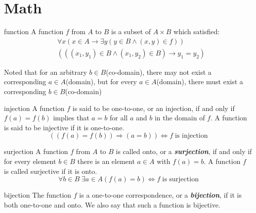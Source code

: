 \section{Math}

\begin{Def}{function}
	A function $f$ from $A$ to $B$ is a subset of $A \times B$ which satisfied:
	\begin{equation}
	\begin{aligned}
			&\forall x (x \in A \rightarrow \exists y (y \in B \land (x,y) \in f)) \\
			&(((x_1, y_1) \in B \land (x_1, y_2) \in B) \rightarrow y_1 = y_2)
	\end{aligned}
	\end{equation}	
\end{Def}

Noted that for an arbitrary $b \in B$(co-domain), there may not exist a corresponding $a \in A$(domain), but for every $a \in A$(domain), there must exist a corresponding $b \in B$(co-domain)

\begin{Def}{injection}
A function $f$ is said to be one-to-one, or an injection, if and only if $f (a) = f (b)$ implies that $a = b$ for all $a$ and $b$ in the domain of $f$. A function is said to be injective if it is one-to-one.
\[ ((f(a) = f(b)) \Rightarrow (a = b)) \Leftrightarrow f \; \text{is injection} \]
\end{Def}


\begin{Def}{surjection}
A function $f$ from $A$ to $B$ is called onto, or a \textbf{\textit{surjection}}, if and only if for every element $b \in B$ there is an element $a \in A$ with $f(a) = b$. A function $f$ is called surjective if it is onto.
\[ \forall b \in B \; \exists a \in A (f(a) = b) \Leftrightarrow f \; \text{is surjection} \]
\end{Def}


\begin{Def}{bijection}
The function $f$ is a one-to-one correspondence, or a \textbf{\textit{bijection}},
if it is both one-to-one and onto. We also say that such a function is bijective.
\end{Def}

